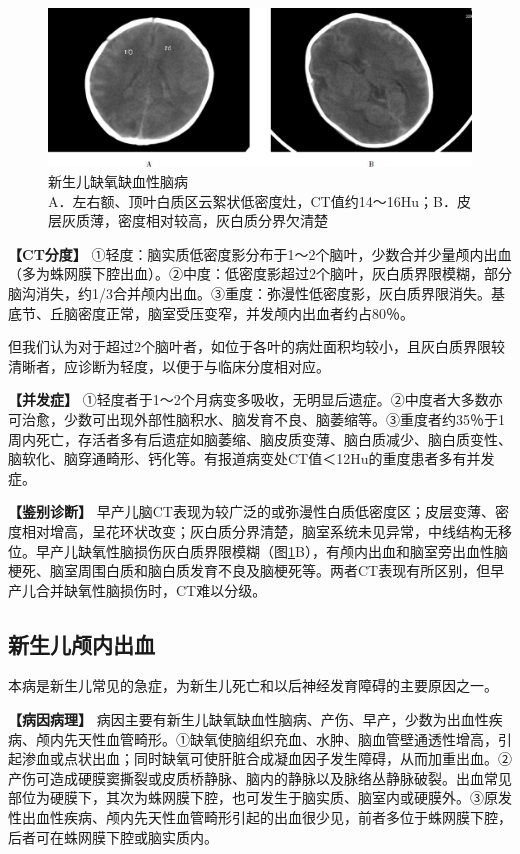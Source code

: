 \begin{figure}[!htbp]
 {\centering
 \includegraphics[width=.7\textwidth,height=\textheight,keepaspectratio]{./images/Image00030.jpg}
 \captionsetup{justification=centering}
 \caption{新生儿缺氧缺血性脑病\\{\small  A．左右额、顶叶白质区云絮状低密度灶，CT值约14～16Hu；B．皮层灰质薄，密度相对较高，灰白质分界欠清楚}}
 \label{fig2-14}}
  \end{figure} 



\textbf{【CT分度】}
①轻度：脑实质低密度影分布于1～2个脑叶，少数合并少量颅内出血（多为蛛网膜下腔出血）。②中度：低密度影超过2个脑叶，灰白质界限模糊，部分脑沟消失，约1/3合并颅内出血。③重度：弥漫性低密度影，灰白质界限消失。基底节、丘脑密度正常，脑室受压变窄，并发颅内出血者约占80％。

但我们认为对于超过2个脑叶者，如位于各叶的病灶面积均较小，且灰白质界限较清晰者，应诊断为轻度，以便于与临床分度相对应。

\textbf{【并发症】}
①轻度者于1～2个月病变多吸收，无明显后遗症。②中度者大多数亦可治愈，少数可出现外部性脑积水、脑发育不良、脑萎缩等。③重度者约35％于1周内死亡，存活者多有后遗症如脑萎缩、脑皮质变薄、脑白质减少、脑白质变性、脑软化、脑穿通畸形、钙化等。有报道病变处CT值＜12Hu的重度患者多有并发症。

\textbf{【鉴别诊断】}
早产儿脑CT表现为较广泛的或弥漫性白质低密度区；皮层变薄、密度相对增高，呈花环状改变；灰白质分界清楚，脑室系统未见异常，中线结构无移位。早产儿缺氧性脑损伤灰白质界限模糊（图\ref{fig2-14}B），有颅内出血和脑室旁出血性脑梗死、脑室周围白质和脑白质发育不良及脑梗死等。两者CT表现有所区别，但早产儿合并缺氧性脑损伤时，CT难以分级。

\subsection{新生儿颅内出血}

本病是新生儿常见的急症，为新生儿死亡和以后神经发育障碍的主要原因之一。

\textbf{【病因病理】}
病因主要有新生儿缺氧缺血性脑病、产伤、早产，少数为出血性疾病、颅内先天性血管畸形。①缺氧使脑组织充血、水肿、脑血管壁通透性增高，引起渗血或点状出血；同时缺氧可使肝脏合成凝血因子发生障碍，从而加重出血。②产伤可造成硬膜窦撕裂或皮质桥静脉、脑内的静脉以及脉络丛静脉破裂。出血常见部位为硬膜下，其次为蛛网膜下腔，也可发生于脑实质、脑室内或硬膜外。③原发性出血性疾病、颅内先天性血管畸形引起的出血很少见，前者多位于蛛网膜下腔，后者可在蛛网膜下腔或脑实质内。

